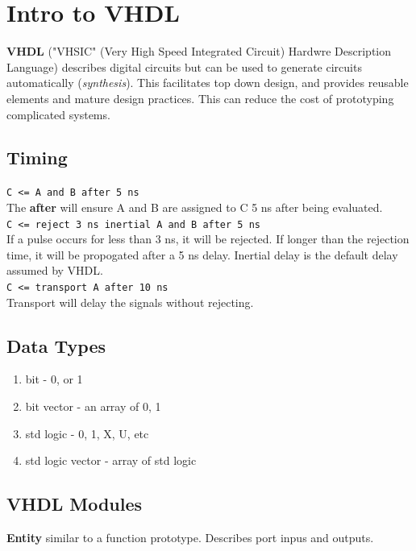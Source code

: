 \documentclass[11pt]{article}
\begin{document}
    \section{Intro to VHDL}
    \textbf{VHDL} ("VHSIC" (Very High Speed Integrated Circuit) Hardwre Description Language) describes digital circuits but can be used to generate circuits automatically (\textit{synthesis}). This facilitates top down design, and provides reusable elements and mature design practices. This can reduce the cost of prototyping complicated systems. \\
    
    \subsection{Timing}
    \verb#C <= A and B after 5 ns# \\ 

    The \textbf{after} will ensure A and B are assigned to C 5 ns after being evaluated. \\ 

    \verb#C <= reject 3 ns inertial A and B after 5 ns# \\ 

    If a pulse occurs for less than 3 ns, it will be rejected. If longer than the rejection time, it will be propogated after a 5 ns delay. Inertial delay is the default delay assumed by VHDL.\\
    
    \verb#C <= transport A after 10 ns# \\ 

    Transport will delay the signals without rejecting.

    \subsection{Data Types}
    \begin{enumerate}
        \item bit - 0, or 1
        \item bit vector - an array of 0, 1
        \item std logic - 0, 1, X, U, etc
        \item std logic vector - array of std logic
    \end{enumerate}

    \subsection{VHDL Modules}
    \textbf{Entity} similar to a function prototype. Describes port inpus and outputs.\\ 
\end{document}
